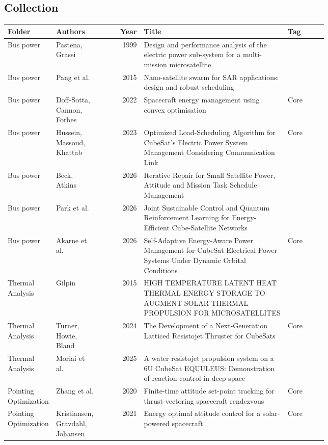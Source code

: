 \subsection{Collection}
\begin{longtable}{@{}p{0.14\linewidth}p{0.14\linewidth}rp{0.45\linewidth}l@{}}
  \toprule
  Folder & Authors & Year & Title & Tag \\
  \midrule
  \endhead
    Bus power & Pastena, Grassi & 1999 & Design and performance analysis of the electric power sub-system for a multi-mission microsatellite &  \\
    Bus power & Pang et al. & 2015 & Nano-satellite swarm for SAR applications: design and robust scheduling &  \\
    Bus power & Doff-Sotta, Cannon, Forbes & 2022 & Spacecraft energy management using convex optimisation & Core \\
    Bus power & Hussein, Massoud, Khattab & 2023 & Optimized Load-Scheduling Algorithm for CubeSat's Electric Power System Management Considering Communication Link & Core \\
    Bus power & Beck, Atkins & 2026 & Iterative Repair for Small Satellite Power, Attitude and Mission Task Schedule Management &  \\
    Bus power & Park et al. & 2026 & Joint Sustainable Control and Quantum Reinforcement Learning for Energy-Efficient Cube-Satellite Networks &  \\
    Bus power & Akarne et al. & 2026 & Self-Adaptive Energy-Aware Power Management for CubeSat Electrical Power Systems Under Dynamic Orbital Conditions & Core \\
    Thermal Analysis & Gilpin & 2015 & HIGH TEMPERATURE LATENT HEAT THERMAL ENERGY STORAGE TO AUGMENT SOLAR THERMAL PROPULSION FOR MICROSATELLITES &  \\
    Thermal Analysis & Turner, Howie, Bland & 2024 & The Development of a Next-Generation Latticed Resistojet Thruster for CubeSats & Core \\
    Thermal Analysis & Moriai et al. & 2025 & A water resistojet propulsion system on a 6U CubeSat EQUULEUS: Demonstration of reaction control in deep space &  \\
    Pointing Optimization & Zhang et al. & 2020 & Finite-time attitude set-point tracking for thrust-vectoring spacecraft rendezvous & Core \\
    Pointing Optimization & Kristiansen, Gravdahl, Johansen & 2021 & Energy optimal attitude control for a solar-powered spacecraft & Core \\

\end{longtable}
